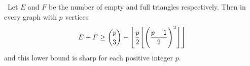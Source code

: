 \documentclass[10pt]{amsart}
\begin{document}

\begin{theorem} \
    Let $E$ and $F$ be the number of empty and full triangles respectively. Then in every graph 
    with $p$ vertices
    \begin{equation}
        E + F \geq \binom{p}{3} - \Bigg \lfloor  \frac{p}{2} \Bigg \lfloor  \Bigg \lparen  \frac{p-1}{2}  \Bigg \rparen^2  \Bigg \rfloor  \Bigg \rfloor \label{eq:theorem1}
    \end{equation}
    and this lower bound is sharp for each positive integer $p$.
\end{theorem}

\end{document}
